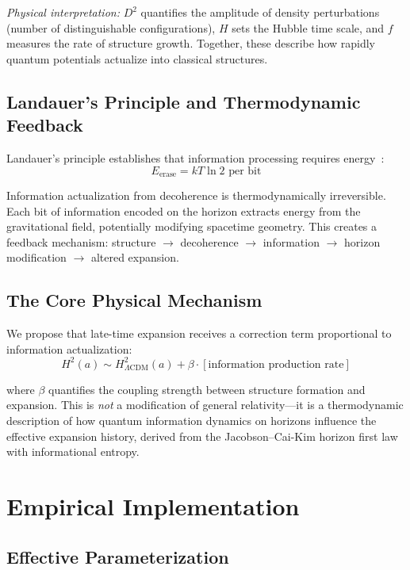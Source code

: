 \documentclass[twocolumn,superscriptaddress,prl,amsmath,amssymb]{revtex4-2}
\begin{document}
\textit{Physical interpretation:} $D^2$ quantifies the amplitude of density perturbations (number of distinguishable configurations), $H$ sets the Hubble time scale, and $f$ measures the rate of structure growth. Together, these describe how rapidly quantum potentials actualize into classical structures.

\subsection{Landauer's Principle and Thermodynamic Feedback}

Landauer's principle establishes that information processing requires energy~\cite{Landauer1961}:
\begin{equation}
E_{\text{erase}} = kT \ln 2 \text{ per bit}
\end{equation}

Information actualization from decoherence is thermodynamically irreversible. Each bit of information encoded on the horizon extracts energy from the gravitational field, potentially modifying spacetime geometry. This creates a feedback mechanism: structure $\to$ decoherence $\to$ information $\to$ horizon modification $\to$ altered expansion.

\subsection{The Core Physical Mechanism}

We propose that late-time expansion receives a correction term proportional to information actualization:
\begin{equation}
H^2(a) \sim H^2_{\Lambda\text{CDM}}(a) + \beta \cdot [\text{information production rate}]
\label{eq:conceptual}
\end{equation}

where $\beta$ quantifies the coupling strength between structure formation and expansion. This is \textit{not} a modification of general relativity---it is a thermodynamic description of how quantum information dynamics on horizons influence the effective expansion history, derived from the Jacobson--Cai-Kim horizon first law with informational entropy.

\section{Empirical Implementation}

\subsection{Effective Parameterization}
\end{document}
